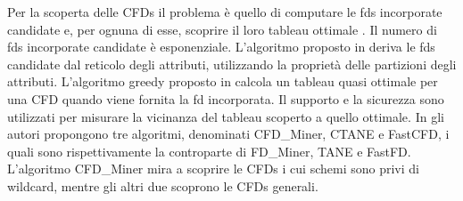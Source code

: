 Per la scoperta delle CFDs il problema \`{e} quello di computare le \acrshort{fds} incorporate candidate e, per ognuna di esse, scoprire il loro tableau ottimale \cite{generatingtableaux}. Il numero di \acrshort{fds} incorporate candidate \`{e} esponenziale. L'algoritmo proposto in \cite{discoveringdataqualityrules} deriva le \acrshort{fds} candidate dal reticolo degli attributi, utilizzando la propriet\`{a} delle partizioni degli attributi. L'algoritmo greedy proposto in \cite{generatingtableaux} calcola un tableau quasi ottimale per una CFD quando viene fornita la \acrshort{fd} incorporata. Il supporto e la sicurezza sono utilizzati per misurare la vicinanza del tableau scoperto a quello ottimale. In \cite{discoveringconditionalfd} gli autori propongono tre algoritmi, denominati CFD\_Miner, CTANE e FastCFD, i quali sono rispettivamente la controparte di FD\_Miner, TANE e FastFD. L'algoritmo CFD\_Miner mira a scoprire le CFDs i cui schemi sono privi di wildcard, mentre gli altri due scoprono le CFDs generali.\par

